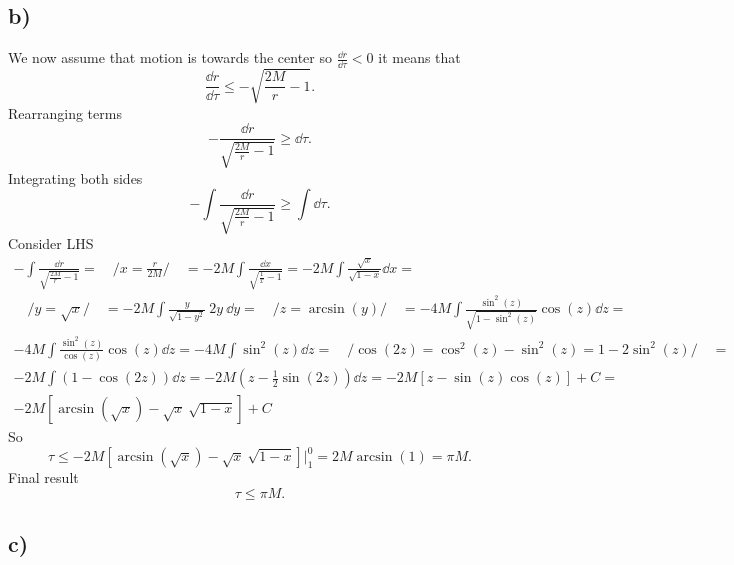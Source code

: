 \subsection*{b)}

We now assume that motion is towards the center so $\frac{\dd r}{\dd \tau} < 0$
it means that
%
\begin{equation}
    \frac{\dd r}{\dd \tau} \leq -\sqrt{\frac{2M}{r}-1}.
\end{equation}
%
Rearranging terms
%
\begin{equation}
    -\frac{\dd r}{\sqrt{\frac{2M}{r}-1}} \geq \dd \tau.
\end{equation}
%
Integrating both sides
%
\begin{equation}
    - \int \frac{\dd r}{\sqrt{\frac{2M}{r}-1}}
    \geq \int \dd \tau.
\end{equation}
%
Consider LHS
%
\begin{multline}
    - \int \frac{\dd r}{\sqrt{\frac{2M}{r}-1}} =
    \quad / x = \frac{r}{2M} / \quad =
    - 2M \int \frac{\dd x}{\sqrt{\frac{1}{x}-1}} =
    - 2M \int \frac{\sqrt{x}}{\sqrt{1-x}}\dd x = \\
    \quad / y = \sqrt{x} / \quad =
    - 2M \int \frac{y}{\sqrt{1-y^2}}~2y~\dd y =
    \quad / z = \arcsin(y) / \quad =
    - 4M \int \frac{\sin^2(z)}{\sqrt{1-\sin^2(z)}} \cos(z)\dd z  = \\
    - 4M \int \frac{\sin^2(z)}{\cos(z)} \cos(z) \dd z =
    - 4M \int \sin^2(z) \dd z =
    \quad / \cos(2z) = \cos^2(z) - \sin^2(z) = 1 - 2\sin^2(z) / \quad = \\
    - 2M \int \left(1 - \cos(2z)\right)  \dd z =
    - 2M \left(z - \frac{1}{2}\sin(2z)\right)  \dd z =
    - 2M \left[z - \sin(z)\cos(z)\right] + C= \\
    - 2M \left[\arcsin(\sqrt{x}) - \sqrt{x}~\sqrt{1-x}\right] + C
\end{multline}
%
So
%
\begin{equation}
    \tau \leq
    - 2M \left[\arcsin(\sqrt{x}) - \sqrt{x}~\sqrt{1-x}\right] \Bigg|_1^0 =
    2M \arcsin(1) = \pi M.
\end{equation}
%
Final result
%
\begin{equation}
    \boxed{\tau \leq \pi M}.
\end{equation}

\subsection*{c)}


